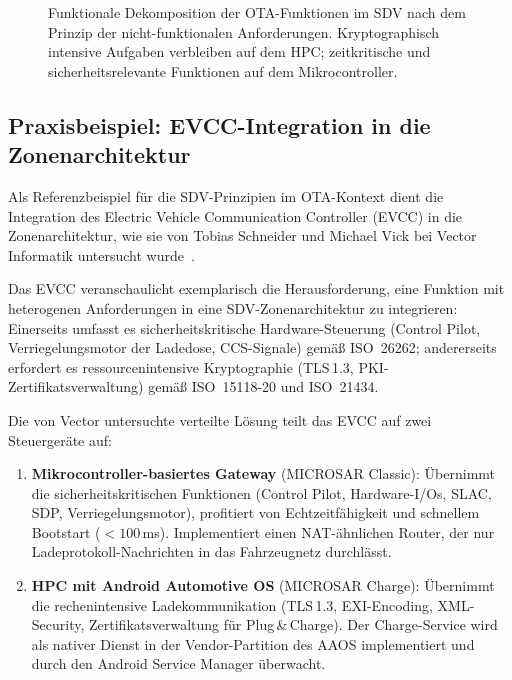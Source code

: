 ﻿\documentclass[12pt,a4paper,twoside]{article}
\begin{document}
\begin{figure}[htbp]
  \caption{Funktionale Dekomposition der OTA-Funktionen im SDV nach dem
    Prinzip der nicht-funktionalen Anforderungen. Kryptographisch intensive
    Aufgaben verbleiben auf dem HPC; zeitkritische und sicherheitsrelevante
    Funktionen auf dem Mikrocontroller.}
  \label{fig:sdv_decomposition}
\end{figure}

\subsection{Praxisbeispiel: EVCC-Integration in die Zonenarchitektur}
\label{subsec:evcc_praxis}

Als Referenzbeispiel für die SDV-Prinzipien im OTA-Kontext dient die
Integration des Electric Vehicle Communication Controller (EVCC) in die
Zonenarchitektur, wie sie von Tobias Schneider und Michael Vick bei Vector
Informatik untersucht wurde~\cite{schneider2026ladekomm}.

Das EVCC veranschaulicht exemplarisch die Herausforderung, eine Funktion
mit heterogenen Anforderungen in eine SDV-Zonenarchitektur zu integrieren:
Einerseits umfasst es sicherheitskritische Hardware-Steuerung (Control Pilot,
Verriegelungsmotor der Ladedose, CCS-Signale) gemäß ISO~26262; andererseits
erfordert es ressourcenintensive Kryptographie (TLS\,1.3, PKI-Zertifikatsverwaltung)
gemäß ISO~15118-20 und ISO~21434.

Die von Vector untersuchte verteilte Lösung teilt das EVCC auf zwei Steuergeräte auf:

\begin{enumerate}
  \item \textbf{Mikrocontroller-basiertes Gateway} (MICROSAR Classic):
    Übernimmt die sicherheitskritischen Funktionen (Control Pilot, Hardware-I/Os,
    SLAC, SDP, Verriegelungsmotor), profitiert von Echtzeitfähigkeit und schnellem
    Bootstart ($<100$\,ms). Implementiert einen NAT-ähnlichen Router, der nur
    Ladeprotokoll-Nachrichten in das Fahrzeugnetz durchlässt.
  \item \textbf{HPC mit Android Automotive OS} (MICROSAR Charge):
    Übernimmt die rechenintensive Ladekommunikation (TLS\,1.3, EXI-Encoding,
    XML-Security, Zertifikatsverwaltung für Plug\,\&\,Charge). Der Charge-Service
    wird als nativer Dienst in der Vendor-Partition des AAOS implementiert
    und durch den Android Service Manager überwacht.
\end{enumerate}
\end{document}

